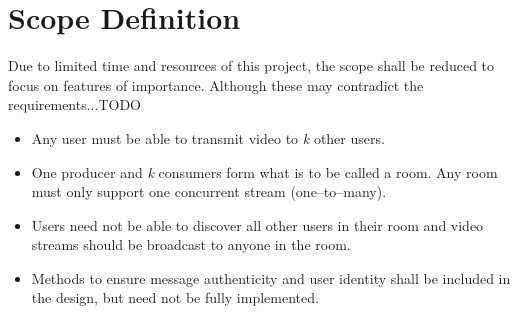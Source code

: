 \section{Scope Definition}

Due to limited time and resources of this project, the scope shall be reduced to focus on features of importance. Although these may contradict the requirements...TODO

\begin{itemize}
    \item Any user must be able to transmit video to \textit{k} other users.
    \item One producer and \textit{k} consumers form what is to be called a room. Any room must only support one concurrent stream (one–to–many).
    \item Users need not be able to discover all other users in their room and video streams should be broadcast to anyone in the room.
    \item Methods to ensure message authenticity and user identity shall be included in the design, but need not be fully implemented.
\end{itemize}
